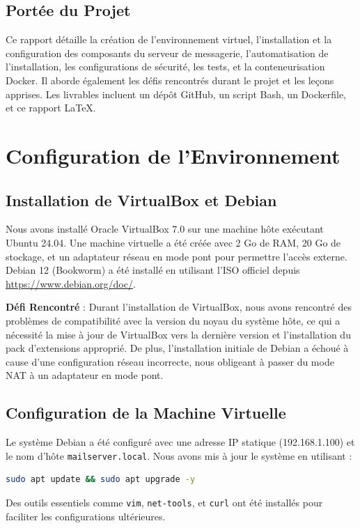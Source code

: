 \documentclass[a4paper,12pt]{article}
\begin{document}
\subsection{Portée du Projet}
Ce rapport détaille la création de l'environnement virtuel, l'installation et la configuration des composants du serveur de messagerie, l'automatisation de l'installation, les configurations de sécurité, les tests, et la conteneurisation Docker. Il aborde également les défis rencontrés durant le projet et les leçons apprises. Les livrables incluent un dépôt GitHub, un script Bash, un Dockerfile, et ce rapport LaTeX.

\section{Configuration de l'Environnement}

\subsection{Installation de VirtualBox et Debian}
Nous avons installé Oracle VirtualBox 7.0 sur une machine hôte exécutant Ubuntu 24.04. Une machine virtuelle a été créée avec 2 Go de RAM, 20 Go de stockage, et un adaptateur réseau en mode pont pour permettre l'accès externe. Debian 12 (Bookworm) a été installé en utilisant l'ISO officiel depuis \url{https://www.debian.org/doc/}.

\textbf{Défi Rencontré} : Durant l'installation de VirtualBox, nous avons rencontré des problèmes de compatibilité avec la version du noyau du système hôte, ce qui a nécessité la mise à jour de VirtualBox vers la dernière version et l'installation du pack d'extensions approprié. De plus, l'installation initiale de Debian a échoué à cause d'une configuration réseau incorrecte, nous obligeant à passer du mode NAT à un adaptateur en mode pont.

\subsection{Configuration de la Machine Virtuelle}
Le système Debian a été configuré avec une adresse IP statique (192.168.1.100) et le nom d'hôte \texttt{mailserver.local}. Nous avons mis à jour le système en utilisant :
\begin{lstlisting}[language=bash]
sudo apt update && sudo apt upgrade -y
\end{lstlisting}
Des outils essentiels comme \texttt{vim}, \texttt{net-tools}, et \texttt{curl} ont été installés pour faciliter les configurations ultérieures.
\end{document}
